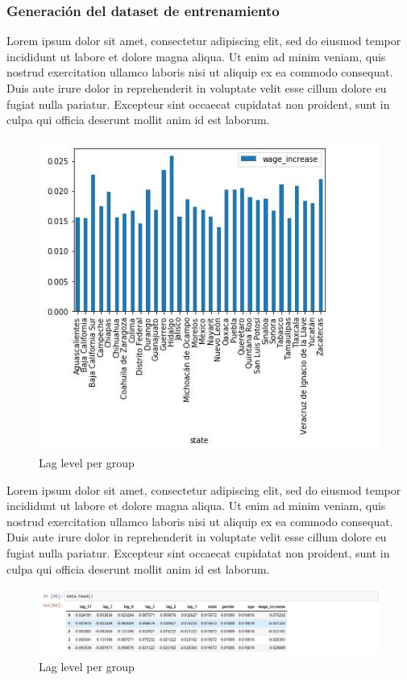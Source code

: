 \subsubsection{Generaci\'on del dataset de entrenamiento}
Lorem ipsum dolor sit amet, consectetur adipiscing elit, sed do eiusmod tempor incididunt ut labore et dolore magna aliqua. Ut enim ad minim veniam, quis nostrud exercitation ullamco laboris nisi ut aliquip ex ea commodo consequat. Duis aute irure dolor in reprehenderit in voluptate velit esse cillum dolore eu fugiat nulla pariatur. Excepteur sint occaecat cupidatat non proident, sunt in culpa qui officia deserunt mollit anim id est laborum.
\begin{figure}[h!]
	\centering
	\includegraphics[width=0.8\linewidth]{Figure/Data_TrainingDataset.JPG}
	\caption{Lag level per group} 
	\label{fig:InitialData}
\end{figure}

Lorem ipsum dolor sit amet, consectetur adipiscing elit, sed do eiusmod tempor incididunt ut labore et dolore magna aliqua. Ut enim ad minim veniam, quis nostrud exercitation ullamco laboris nisi ut aliquip ex ea commodo consequat. Duis aute irure dolor in reprehenderit in voluptate velit esse cillum dolore eu fugiat nulla pariatur. Excepteur sint occaecat cupidatat non proident, sunt in culpa qui officia deserunt mollit anim id est laborum.
\begin{figure}[h!]
	\centering
	\includegraphics[width=1\linewidth]{Figure/DataSet_TrainingDataset.JPG}
	\caption{Lag level per group} 
	\label{fig:TrainingDataSet}
\end{figure}


